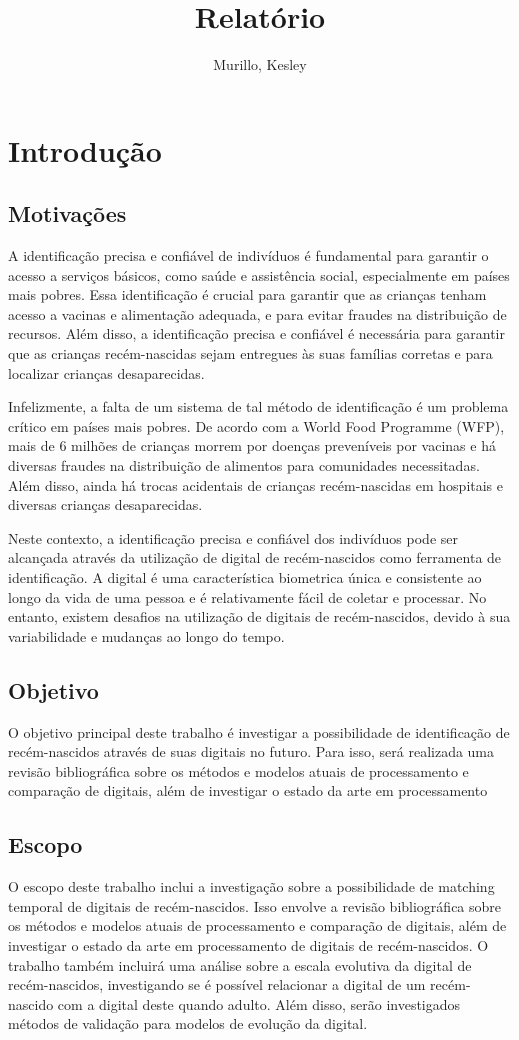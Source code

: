 \documentclass[12pt,a4paper]{article}
\title{Relatório}
\author{Murillo, Kesley}
\begin{document}
\tableofcontents

\section{Introdução}
\subsection{Motivações}

A identificação precisa e confiável de indivíduos é fundamental para garantir o acesso a serviços básicos, como saúde e assistência social, especialmente em países mais pobres. Essa identificação é crucial para garantir que as crianças tenham acesso a vacinas e alimentação adequada, e para evitar fraudes na distribuição de recursos. Além disso, a identificação precisa e confiável é necessária para garantir que as crianças recém-nascidas sejam entregues às suas famílias corretas e para localizar crianças desaparecidas.

Infelizmente, a falta de um sistema de tal método de identificação é um problema crítico em países mais pobres. De acordo com a World Food Programme (WFP), mais de 6 milhões de crianças morrem por doenças preveníveis por vacinas e há diversas fraudes na distribuição de alimentos para comunidades necessitadas. Além disso, ainda há trocas acidentais de crianças recém-nascidas em hospitais e diversas crianças desaparecidas.

Neste contexto, a identificação precisa e confiável dos indivíduos pode ser alcançada através da utilização de digital de recém-nascidos como ferramenta de identificação. A digital é uma característica biometrica única e consistente ao longo da vida de uma pessoa e é relativamente fácil de coletar e processar. No entanto, existem desafios na utilização de digitais de recém-nascidos, devido à sua variabilidade e mudanças ao longo do tempo.

\subsection{Objetivo}
O objetivo principal deste trabalho é investigar a possibilidade de identificação de recém-nascidos através de suas digitais no futuro. Para isso, será realizada uma revisão bibliográfica sobre os métodos e modelos atuais de processamento e comparação de digitais, além de investigar o estado da arte em processamento

\subsection{Escopo}
O escopo deste trabalho inclui a investigação sobre a possibilidade de matching temporal de digitais de recém-nascidos. Isso envolve a revisão bibliográfica sobre os métodos e modelos atuais de processamento e comparação de digitais, além de investigar o estado da arte em processamento de digitais de recém-nascidos. O trabalho também incluirá uma análise sobre a escala evolutiva da digital de recém-nascidos, investigando se é possível relacionar a digital de um recém-nascido com a digital deste quando adulto. Além disso, serão investigados métodos de validação para modelos de evolução da digital.
\end{document}
